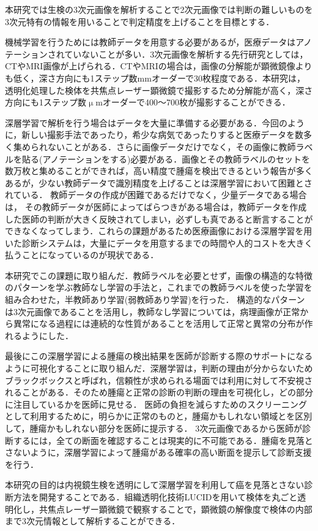 本研究では生検の3次元画像を解析することで2次元画像では判断の難しいものを3次元特有の情報を用いることで判定精度を上げることを目標とする．

機械学習を行うためには教師データを用意する必要があるが，医療データはアノテーションされていないことが多い．3次元画像を解析する先行研究としては，CTやMRI画像が上げられる\cite{要出典}．CTやMRIの場合は，画像の分解能が顕微鏡像よりも低く，深さ方向にも1ステップ数mmオーダーで30枚程度である．本研究は，透明化処理した検体を共焦点レーザー顕微鏡で撮影するため分解能が高く，深さ方向にも1ステップ数$\upmu$mオーダーで400〜700枚が撮影することができる．



深層学習で解析を行う場合はデータを大量に準備する必要がある．今回のように，新しい撮影手法であったり，希少な病気であったりすると医療データを数多く集められないことがある．さらに画像データだけでなく，その画像に教師ラベルを貼る(アノテーションをする)必要がある．画像とその教師ラベルのセットを数万枚と集めることができれば，高い精度で腫瘍を検出できるという報告が多くあるが\cite{要出典複数}，少ない教師データで識別精度を上げることは深層学習において困難とされている．
教師データの作成が困難であるだけでなく，少量データである場合は，
その教師データが医師によってばらつきがある場合は，教師データを作成した医師の判断が大きく反映されてしまい，必ずしも真であると断言することができなくなってしまう．これらの課題があるため医療画像における深層学習を用いた診断システムは，大量にデータを用意するまでの時間や人的コストを大きく払うことになっているのが現状である．

本研究でこの課題に取り組んだ．教師ラベルを必要とせず，画像の構造的な特徴のパターンを学ぶ教師なし学習の手法と，これまでの教師ラベルを使った学習を組み合わせた，半教師あり学習(弱教師あり学習)を行った．
構造的なパターンは3次元画像であることを活用し，教師なし学習については，病理画像が正常から異常になる過程には連続的な性質があることを活用して正常と異常の分布が作れるようにした．


最後にこの深層学習による腫瘍の検出結果を医師が診断する際のサポートになるように可視化することに取り組んだ．深層学習は，判断の理由が分からないためブラックボックスと呼ばれ，信頼性が求められる場面では利用に対して不安視されることがある．そのため腫瘍と正常の診断の判断の理由を可視化し，どの部分に注目しているかを医師に見せる．
医師の負担を減らすためのスクリーニングとして利用するために，明らかに正常のものと，腫瘍かもしれない領域とを区別して，腫瘍かもしれない部分を医師に提示する．
3次元画像であるから医師が診断するには，全ての断面を確認することは現実的に不可能である．腫瘍を見落とさないように，深層学習によって腫瘍がある確率の高い断面を提示して診断支援を行う．

本研究の目的は内視鏡生検を透明にして深層学習を利用して癌を見落とさない診断方法を開発することである．組織透明化技術LUCIDを用いて検体を丸ごと透明化し，共焦点レーザー顕微鏡で観察することで，顕微鏡の解像度で検体の内部まで3次元情報として解析することができる．

